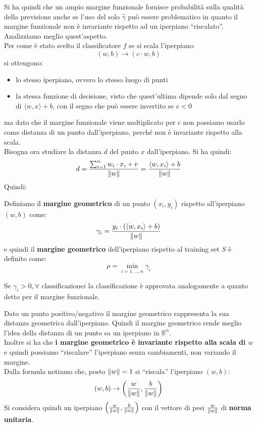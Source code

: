 Si ha quindi che un ampio margine funzionale fornisce probabilità sulla qualità
della previsione anche se l'uso del solo $\hat{\gamma}$ può essere problematico
in quanto il margine funzionale non è invariante rispetto ad un iperpiano
``riscalato''. Analizziamo meglio quest'aspetto.\\
Per come è stato scelto il classificatore $f$ se si scala l'iperpiano:
\[(w,b)\to(c\cdot w,b)\]
si ottengono:
\begin{itemize}
  \item lo stesso iperpiano, ovvero lo stesso luogo di punti
  \item la stessa funzione di decisione, visto che quest'ultima dipende solo dal
  segno di $\langle w,x\rangle+b$, con il segno che può essere invertito se
  $c<0$ 
\end{itemize}
ma dato che il margine funzionale viene moltiplicato per $c$ non possiamo usarlo
come distanza di un punto dall’iperpiano, perché non è invariante rispetto alla
scala.\\
Bisogna ora studiare la distanza $d$ del punto $x$ dall'iperpiano. Si ha quindi:
\[d = \frac{\sum_{i=1}^n w_i\cdot x_i+v}{\norm{w}}=\frac{\langle w,
    x_i\rangle +b}{\norm{w}} \]
Quindi:
\begin{definizione}
  Definiamo il \textbf{margine geometrico} di un punto $(x_i,y_i)$ rispetto
  all'iperpiano $(w,b)$ come:
  \[\gamma_i=\frac{y_i\cdot(\langle w,x_i\rangle+b)}{\norm{w}}\]
  e quindi il \textbf{margine geometrico} dell'iperpiano rispetto al training
  set $S$ è definito come:
  \[\rho=\min_{i=1,\ldots, n}\gamma_i\]
\end{definizione}
\begin{teorema}
  Se $\gamma_i>0,\forall \mbox{ classificazione} i$ la classificazione è
  approvata analogamente a quanto detto per il margine funzionale.
\end{teorema}
Dato un punto positivo/negativo il margine geometrico rappresenta la sua
distanza geometrica dall'iperpiano. Quindi il margine geometrico rende meglio
l'idea della distanza di un punto sa un iperpiano in $\mathbb{R}^n$.\\
Inoltre si ha che \textbf{i margine geometrico è invariante rispetto alla scala
  di $w$} e quindi possiamo ``riscalare'' l'iperpiano senza cambiamenti, non
variando il margine.\\
Dalla formula notiamo che, posto $\norm{w}=1$ si ``riscala'' l'iperpiano $(w,b)$:
\[(w,b)\to\left(\frac{w}{\norm{w}},\frac{b}{\norm{w}}\right)\]
Si considera quindi un iperpiano
$\left(\frac{w}{\norm{w}},\frac{b}{\norm{w}}\right)$ con il vettore di pesi
$\frac{w}{\norm{w}}$ di \textbf{norma unitaria}.
